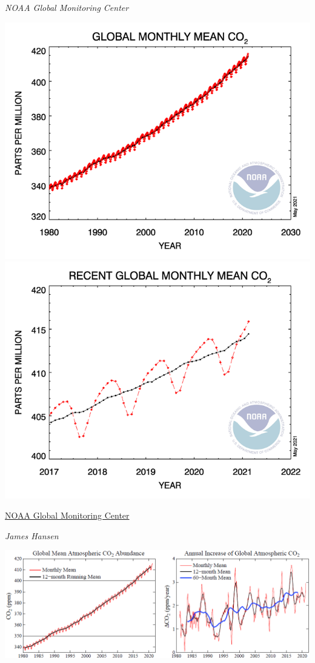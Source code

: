 \documentclass[
]{book}
\begin{document}
\emph{NOAA Global Monitoring Center}

\includegraphics{fig/co2_trend_all_gl_may21.png}
\includegraphics{fig/co2_trend_gl_may21.png}

\href{https://gml.noaa.gov/ccgg/trends/global.html}{NOAA Global Monitoring Center}

\emph{James Hansen}

\includegraphics{fig/CO2_Annual_Increase.png}
\end{document}
